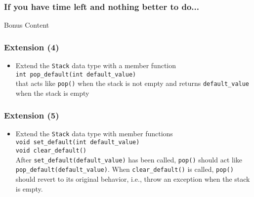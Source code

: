 \documentclass[10pt,aspectratio=169]{beamer}
\begin{document}
\begin{frame}[fragile]
    \frametitle{If you have time left and nothing better to do...}
    \begin{center}
        \LARGE Bonus Content
    \end{center}
\end{frame}

\begin{frame}[fragile]
    \frametitle{Extension (4)}  
    \begin{itemize}
    \item Extend the \texttt{Stack} data type with a member function\\[1ex]
      \verb!int pop_default(int default_value)!\\[1ex]
      that acts like \texttt{pop()} when the stack is not empty and
      returns \verb!default_value! when the stack is empty
    \end{itemize}
  \end{frame}
  
  \begin{frame}[fragile]
    \frametitle{Extension (5)}  
    \begin{itemize}
    \item Extend the \texttt{Stack} data type with member functions\\[1ex]
      \verb!void set_default(int default_value)!\\
      \verb!void clear_default()!\\[1ex]
      After \verb!set_default(default_value)! has been called, \texttt{pop()}
      should act like \verb!pop_default(default_value)!. When
      \verb!clear_default()! is called, \texttt{pop()} should revert to
      its original behavior, i.e., throw an exception when the stack is
      empty.
    \end{itemize}
  \end{frame}
  
\end{document}
